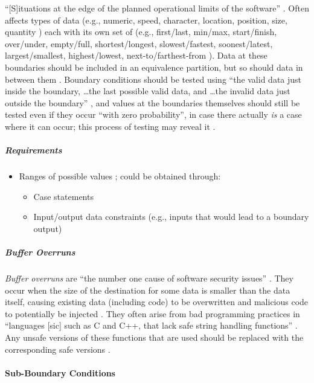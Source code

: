 ``[S]ituations at the edge of the planned operational limits of the software''
\citep[p.~72]{Patton2006}. Often affects types of data (e.g., numeric,
speed, character, location, position, size, quantity
\citep[p.~72]{Patton2006}) each with its own set of (e.g., first/last,
min/max, start/finish, over/under, empty/full, shortest/longest,
slowest/fastest, soonest/latest, largest/smallest, highest/lowest,
next-to/farthest-from \citep[pp.~72-73]{Patton2006}). Data at these
boundaries should be included in an equivalence partition, but so should
data in between them \citep[p.~73]{Patton2006}. Boundary conditions
should be tested using ``the valid data just inside the boundary,
\dots the last possible valid data, and \dots the invalid data just outside the
boundary'' \citep[p.~73]{Patton2006}, and values at the boundaries
themselves should still be tested even if they occur ``with zero probability'',
in case there actually \emph{is} a case where it can occur; this process of
testing may reveal it \citep[p.~460]{PetersAndPedrycz2000}.

\subparagraph{Requirements}
\begin{itemize}
      \item Ranges of possible values \citep[p.~67, 73]{Patton2006};
            could be obtained through:
            \begin{itemize}
                  \item Case statements
                  \item Input/output data constraints (e.g., inputs that
                        would lead to a boundary output)
            \end{itemize}
\end{itemize}

\subparagraph{Buffer Overruns \citep[pp.~201-205]{Patton2006}}

\emph{Buffer overruns} are ``the number one cause of software security issues''
\citep[p.~75]{Patton2006}. They occur when the size of the destination
for some data is smaller than the data itself, causing existing data (including
code) to be overwritten and malicious code to potentially be injected
\citep[p.~202, 204-205]{Patton2006}. They often arise from bad
programming practices in ``languages [sic] such as C and C++, that lack safe
string handling functions'' \citep[p.~201]{Patton2006}. Any unsafe
versions of these functions that are used should be replaced with the
corresponding safe versions \citep[pp.~203-204]{Patton2006}.

\paragraph{Sub-Boundary Conditions \citep[pp.~75-77]{Patton2006}}
\label{sub-bound-conds}

